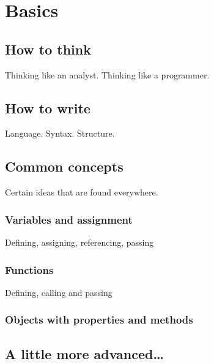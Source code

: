 \chapter{Basics}
\label{chapter:basics}

\section{How to think}

Thinking like an analyst. Thinking like a programmer.

\section{How to write}

Language. Syntax. Structure.


\section{Common concepts}

Certain ideas that are found everywhere.

\subsection{Variables and assignment}

Defining, assigning, referencing, passing

\subsection{Functions}

Defining, calling and passing

\subsection{Objects with properties and methods}

\section{A little more advanced\ldots}

